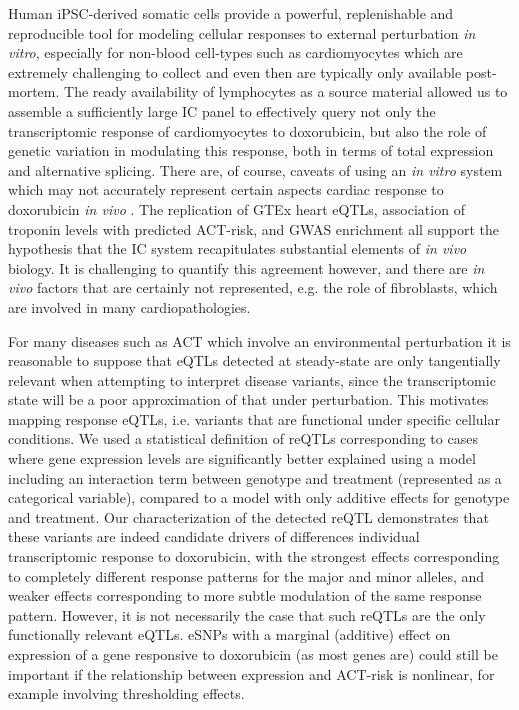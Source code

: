 \documentclass{article}
\begin{document}
Human iPSC-derived somatic cells provide a powerful, replenishable and reproducible tool for modeling cellular responses to external perturbation \emph{in vitro}, especially for non-blood cell-types such as cardiomyocytes which are extremely challenging to collect and even then are typically only available post-mortem. 
The ready availability of lymphocytes as a source material allowed us to assemble a sufficiently large IC panel to effectively query not only the transcriptomic response of cardiomyocytes to doxorubicin, but also the role of genetic variation in modulating this response, both in terms of total expression and alternative splicing. 
There are, of course, caveats of using an \emph{in vitro} system which may not accurately represent certain aspects cardiac response to doxorubicin \emph{in vivo} . 
The replication of GTEx heart eQTLs, association of troponin levels with predicted ACT-risk, and GWAS enrichment all support the hypothesis that the IC system recapitulates substantial elements of \emph{in vivo} biology. 
It is challenging to quantify this agreement however, and there are \emph{in vivo} factors that are certainly not represented, e.g. the role of fibroblasts, which are involved in many cardiopathologies\cite{todo}. 

For many diseases such as ACT which involve an environmental perturbation it is reasonable to suppose that eQTLs detected at steady-state are only tangentially relevant when attempting to interpret disease variants, since the transcriptomic state will be a poor approximation of that under perturbation. 
This motivates mapping response eQTLs, i.e. variants that are functional under specific cellular conditions.
We used a statistical definition of reQTLs corresponding to cases where gene expression levels are significantly better explained using a model including an interaction term between genotype and treatment (represented as a categorical variable), compared to a model with only additive effects for genotype and treatment. 
Our characterization of the detected reQTL demonstrates that these variants are indeed candidate drivers of differences individual transcriptomic response to doxorubicin, with the strongest effects corresponding to completely different response patterns for the major and minor alleles, and weaker effects corresponding to more subtle modulation of the same response pattern. 
However, it is not necessarily the case that such reQTLs are the only functionally relevant eQTLs. eSNPs with a marginal (additive) effect on expression of a gene responsive to doxorubicin (as most genes are) could still be important if the relationship between expression and ACT-risk is nonlinear, for example involving thresholding effects. 
\end{document}
